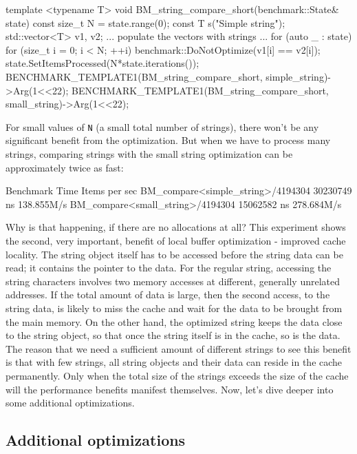 \begin{code}
template <typename T>
void BM_string_compare_short(benchmark::State& state) {
  const size_t N = state.range(0);
  const T s("Simple string");
  std::vector<T> v1, v2;
  ... populate the vectors with strings ...
  for (auto _ : state) {
    for (size_t i = 0; i < N; ++i) {
      benchmark::DoNotOptimize(v1[i] == v2[i]);
    }
  }
  state.SetItemsProcessed(N*state.iterations());
}
BENCHMARK_TEMPLATE1(BM_string_compare_short,
                    simple_string)->Arg(1<<22);
BENCHMARK_TEMPLATE1(BM_string_compare_short,
                    small_string)->Arg(1<<22);
\end{code}

For small values of \texttt{N} (a small total number of strings), there won't be any significant benefit from the optimization. But when we have to process many strings, comparing strings with the small string optimization can be approximately twice as fast:

\begin{code}
Benchmark                                Time Items per sec
BM_compare<simple_string>/4194304    30230749 ns 138.855M/s
BM_compare<small_string>/4194304     15062582 ns 278.684M/s
\end{code}

Why is that happening, if there are no allocations at all? This experiment shows the second, very important, benefit of local buffer optimization - improved cache locality. The string object itself has to be accessed before the string data can be read; it contains the pointer to the data. For the regular string, accessing the string characters involves two memory accesses at different, generally unrelated addresses. If the total amount of data is large, then the second access, to the string data, is likely to miss the cache and wait for the data to be brought from the main memory. On the other hand, the optimized string keeps the data close to the string object, so that once the string itself is in the cache, so is the data. The reason that we need a sufficient amount of different strings to see this benefit is that with few strings, all string objects and their data can reside in the cache permanently. Only when the total size of the strings exceeds the size of the cache will the performance benefits manifest themselves. Now, let's dive deeper into some additional optimizations.

\subsection{Additional optimizations}

